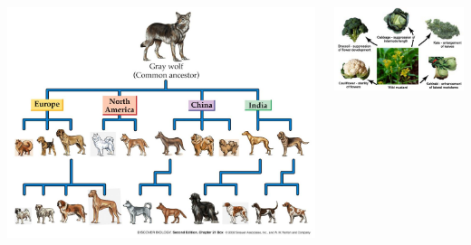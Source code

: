 \documentclass[10pt]{beamer}
\begin{document}
\begin{frame}
	\begin{columns}
		\begin{column}{0.5\textwidth}
			\begin{center}
				\includegraphics[width=1.0\textwidth]{figures/dogs.jpg}
			\end{center}
		\end{column}
		
		\begin{column}{0.5\textwidth}
			\begin{center}
				\includegraphics[width=1.0\textwidth]{figures/mustard.jpg}
			\end{center}
		\end{column}
	\end{columns}
\end{frame} 
\end{document}
